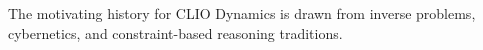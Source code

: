 The motivating history for CLIO Dynamics is drawn from inverse problems, cybernetics, and constraint-based reasoning traditions.
